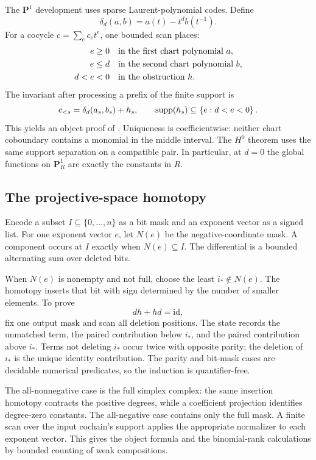 The $\mathbf P^1$ development uses sparse Laurent-polynomial codes.  Define
\[
       \delta_d(a,b)=a(t)-t^d b(t^{-1}).
\]
For a cocycle $c=\sum_e c_e t^e$, one bounded scan places:
\begin{align*}
 e\geq0 &\quad\hbox{in the first chart polynomial }a,\\
 e\leq d&\quad\hbox{in the second chart polynomial }b,\\
 d<e<0&\quad\hbox{in the obstruction }h.
\end{align*}
The invariant after processing a prefix of the finite support is
\[
       c_{<s}=\delta_d(a_s,b_s)+h_s,
       \qquad \operatorname{supp}(h_s)\subseteq\left\{e:d<e<0\right\}.
\]
This yields an object proof of .  Uniqueness is coefficientwise: neither
chart coboundary contains a monomial in the middle interval.  The $H^0$ theorem uses the same support
separation on a compatible pair.  In particular, at $d=0$ the global functions on $\mathbf P^1_R$
are exactly the constants in $R$.

\subsection{The projective-space homotopy}

Encode a subset $I\subseteq\{0,\ldots,n\}$ as a bit mask and an exponent vector as a signed list.
For one exponent vector $e$, let $N(e)$ be the negative-coordinate mask.  A component occurs at
$I$ exactly when $N(e)\subseteq I$.  The differential is a bounded alternating sum over deleted
bits.

When $N(e)$ is nonempty and not full, choose the least $i_*\notin N(e)$.  The homotopy inserts that
bit with sign determined by the number of smaller elements.  To prove
\[
                              dh+hd=\mathrm{id},             \tag{14.6}\label{eq:cech-homotopy-object}
\]
fix one output mask and scan all deletion positions.  The state records the unmatched term, the
paired contribution below $i_*$, and the paired contribution above $i_*$.  Terms not deleting
$i_*$ occur twice with opposite parity; the deletion of $i_*$ is the unique identity contribution.
The parity and bit-mask cases are decidable numerical predicates, so the induction is
quantifier-free.

The all-nonnegative case is the full simplex complex: the same insertion homotopy contracts the
positive degrees, while a coefficient projection identifies degree-zero constants.  The all-negative
case contains only the full mask.  A finite scan over the input cochain's support applies the
appropriate normalizer to each exponent vector.  This gives the object formula
 and the binomial-rank calculations by bounded counting of weak
compositions.

